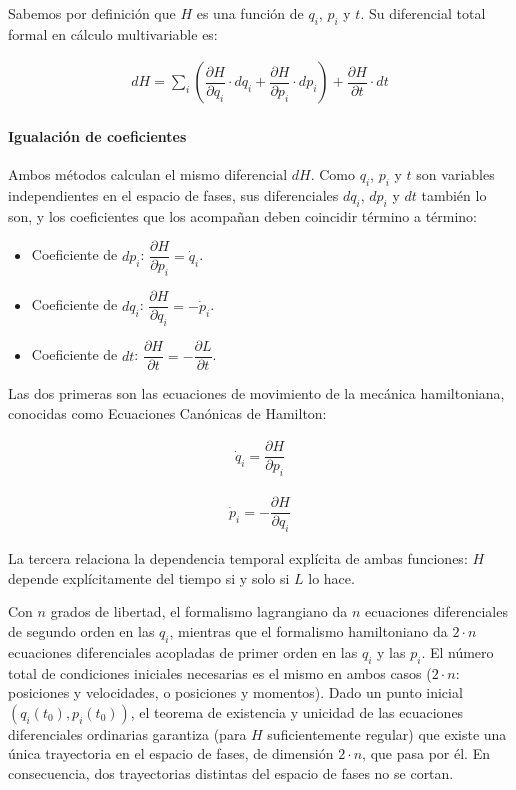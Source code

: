 \documentclass[
  spanish,
]{article}
\providecommand{\tightlist}{%
  \setlength{\itemsep}{0pt}\setlength{\parskip}{0pt}}
\begin{document}
Sabemos por definición que \(H\) es una función de \(q_i\), \(p_i\) y
\(t\). Su diferencial total formal en cálculo multivariable es:

\[
\begin{aligned}
dH = \sum_{i} \left( \dfrac{\partial H}{\partial q_i} \cdot dq_i + \dfrac{\partial H}{\partial p_i} \cdot dp_i \right) + \dfrac{\partial H}{\partial t} \cdot dt
\end{aligned}
\]

\paragraph{Igualación de
coeficientes}\label{igualaciuxf3n-de-coeficientes}

Ambos métodos calculan el mismo diferencial \(dH\). Como \(q_i\),
\(p_i\) y \(t\) son variables independientes en el espacio de fases, sus
diferenciales \(dq_i\), \(dp_i\) y \(dt\) también lo son, y los
coeficientes que los acompañan deben coincidir término a término:

\begin{itemize}
\tightlist
\item
  Coeficiente de \(dp_i\):
  \(\dfrac{\partial H}{\partial p_i} = \dot{q}_i\).
\item
  Coeficiente de \(dq_i\):
  \(\dfrac{\partial H}{\partial q_i} = -\dot{p}_i\).
\item
  Coeficiente de \(dt\):
  \(\dfrac{\partial H}{\partial t} = -\dfrac{\partial L}{\partial t}\).
\end{itemize}

Las dos primeras son las ecuaciones de movimiento de la mecánica
hamiltoniana, conocidas como Ecuaciones Canónicas de Hamilton:

\[
\begin{aligned}
\dot{q}_i = \dfrac{\partial H}{\partial p_i}
\end{aligned}
\]

\[
\begin{aligned}
\dot{p}_i = -\dfrac{\partial H}{\partial q_i}
\end{aligned}
\]

La tercera relaciona la dependencia temporal explícita de ambas
funciones: \(H\) depende explícitamente del tiempo si y solo si \(L\) lo
hace.

Con \(n\) grados de libertad, el formalismo lagrangiano da \(n\)
ecuaciones diferenciales de segundo orden en las \(q_i\), mientras que
el formalismo hamiltoniano da \(2 \cdot n\) ecuaciones diferenciales
acopladas de primer orden en las \(q_i\) y las \(p_i\). El número total
de condiciones iniciales necesarias es el mismo en ambos casos
(\(2 \cdot n\): posiciones y velocidades, o posiciones y momentos). Dado
un punto inicial \((q_i(t_0), p_i(t_0))\), el teorema de existencia y
unicidad de las ecuaciones diferenciales ordinarias garantiza (para
\(H\) suficientemente regular) que existe una única trayectoria en el
espacio de fases, de dimensión \(2 \cdot n\), que pasa por él. En
consecuencia, dos trayectorias distintas del espacio de fases no se
cortan.
\end{document}
